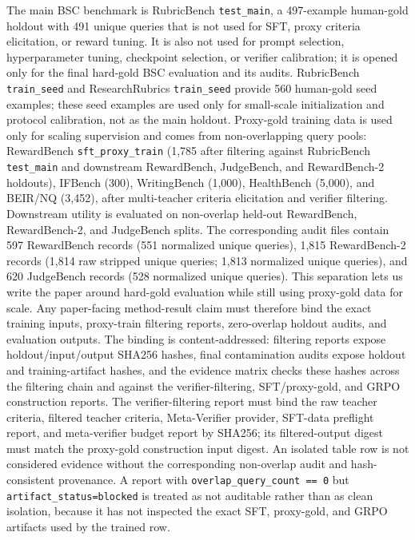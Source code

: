 The main BSC benchmark is RubricBench \texttt{test\_main}, a 497-example
human-gold holdout with 491 unique queries that is not used for SFT, proxy criteria elicitation, or reward tuning.
It is also not used for prompt selection, hyperparameter tuning, checkpoint
selection, or verifier calibration; it is opened only for the final hard-gold
BSC evaluation and its audits.
RubricBench \texttt{train\_seed} and ResearchRubrics \texttt{train\_seed}
provide 560 human-gold seed examples; these seed examples are used only for
small-scale initialization and protocol calibration, not as the main holdout.
Proxy-gold training data is used only for scaling supervision and comes from
non-overlapping query pools: RewardBench \texttt{sft\_proxy\_train} (1,785
after filtering against RubricBench \texttt{test\_main} and downstream
RewardBench, JudgeBench, and RewardBench-2 holdouts),
IFBench (300), WritingBench (1,000), HealthBench (5,000), and BEIR/NQ (3,452),
after multi-teacher criteria elicitation and verifier filtering. Downstream utility is
evaluated on non-overlap held-out RewardBench, RewardBench-2, and JudgeBench
splits. The corresponding audit files contain 597 RewardBench records
(551 normalized unique queries), 1,815 RewardBench-2 records (1,814 raw stripped
unique queries; 1,813 normalized unique queries), and 620 JudgeBench records
(528 normalized unique queries). This separation lets us write the paper around hard-gold evaluation
while still using proxy-gold data for scale.
Any paper-facing method-result claim must therefore bind the exact training
inputs, proxy-train filtering reports, zero-overlap holdout audits, and
evaluation outputs. The binding is content-addressed: filtering reports expose
holdout/input/output SHA256 hashes, final contamination audits expose holdout
and training-artifact hashes, and the evidence matrix checks these hashes
across the filtering chain and against the verifier-filtering,
SFT/proxy-gold, and GRPO construction reports. The verifier-filtering report
must bind the raw teacher criteria, filtered teacher criteria, Meta-Verifier
provider, SFT-data preflight report, and meta-verifier budget report by SHA256;
its filtered-output digest must match the proxy-gold construction input digest.
An isolated table row is not considered evidence without the corresponding
non-overlap audit and hash-consistent provenance. A report with
\texttt{overlap\_query\_count == 0} but
\texttt{artifact\_status=blocked} is treated as not auditable rather than as
clean isolation, because it has not inspected the exact SFT, proxy-gold, and
GRPO artifacts used by the trained row.

